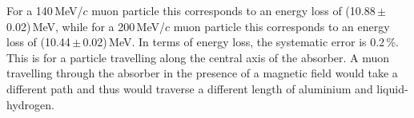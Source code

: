 For a 140\,MeV/$c$ muon particle this corresponds to an energy loss of (10.88\,$\mathrm{\pm}$\,0.02)\,MeV, while for a 200\,MeV/$c$ muon particle this corresponds to an energy loss of (10.44\,$\mathrm{\pm}$\,0.02)\,MeV. In terms of energy loss, the systematic error is 0.2\,\%. This is for a particle travelling along the central axis of the absorber. A muon travelling through the absorber in the presence of a magnetic field would take a different path and thus would traverse a different length of aluminium and liquid-hydrogen.
 




